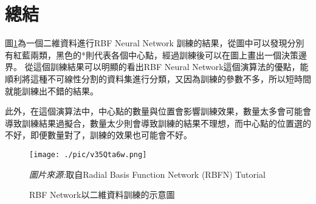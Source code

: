 \section {總結}
圖\ref{fig:RbfOutcome}為一個二維資料進行RBF Neural Network 訓練的結果，從圖中可以發現分別有紅藍兩類，黑色的*則代表各個中心點，經過訓練後可以在圖上畫出一個決策邊界。
從這個訓練結果可以明顯的看出RBF Neural Network這個演算法的優點，能順利將這種不可線性分割的資料集進行分類，又因為訓練的參數不多，所以短時間就能訓練出不錯的結果。

此外，在這個演算法中，中心點的數量與位置會影響訓練效果，數量太多會可能會導致訓練結果過擬合，數量太少則會導致訓練的結果不理想，而中心點的位置選的不好，即便數量對了，訓練的效果也可能會不好。




\begin{figure}[h]
	\centering
	\texttt{[image: ./pic/v35Qta6w.png]}
	\caption{RBF Network以二維資料訓練的示意圖}

	\begin{minipage}{.7\linewidth}
		\centering
		\footnotesize
		\emph{圖片來源:}取自Radial Basis Function Network (RBFN) Tutorial
	\end{minipage}

	\label{fig:RbfOutcome}
\end{figure}
